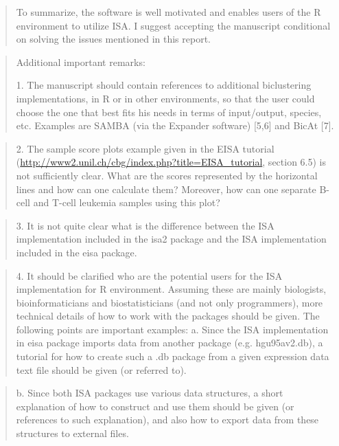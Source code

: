 \documentclass[a4paper]{article}
\begin{document}
\begin{quote}
To summarize, the software is well motivated and enables users of the
R environment to utilize ISA. I suggest accepting the manuscript
conditional on solving the issues mentioned in this report. 
\end{quote}

\begin{quote}
Additional important remarks:

1.      The manuscript should contain references to additional
biclustering implementations, in R or in other environments, so that
the user could choose the one that best fits his needs in terms of
input/output, species, etc. Examples are SAMBA (via the Expander
software) [5,6] and BicAt [7]. 
\end{quote}

\begin{quote}
2.      The sample score plots example given in the EISA tutorial
(\url{http://www2.unil.ch/cbg/index.php?title=EISA\_tutorial}, section 6.5)
is not sufficiently clear. What are the scores represented by the
horizontal lines and how can one calculate them? Moreover, how can one
separate B-cell and T-cell leukemia samples using this plot? 
\end{quote}

\begin{quote}
3.      It is not quite clear what is the difference between the ISA
implementation included in the isa2 package and the ISA implementation
included in the eisa package. 
\end{quote}

\begin{quote}
4.      It should be clarified who are the potential users for the ISA
implementation for R environment. Assuming these are mainly
biologists, bioinformaticians and biostatisticians (and not only
programmers), more technical details of how to work with the packages
should be given. The following points are important examples: 
a.      Since the ISA implementation in eisa package imports data from
another package (e.g. hgu95av2.db), a tutorial for how to create such
a .db package from a given expression data text file should be given
(or referred to). 
\end{quote}

\begin{quote}
b.      Since both ISA packages use various data structures, a short
explanation of how to construct and use them should be given (or
references to such explanation), and also how to export data from
these structures to external files. 
\end{quote}
\end{document}
